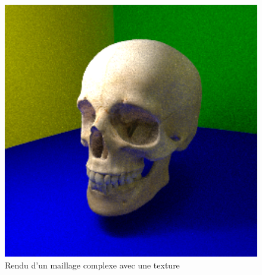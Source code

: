 \documentclass[12pt]{article}
\begin{document}
\begin{figure}[ht]
  \centering
  \includegraphics[width=12cm]{../result/step10}
  \caption{Rendu d'un maillage complexe avec une texture}\label{fig:../result/step10}
\end{figure}
\end{document}
